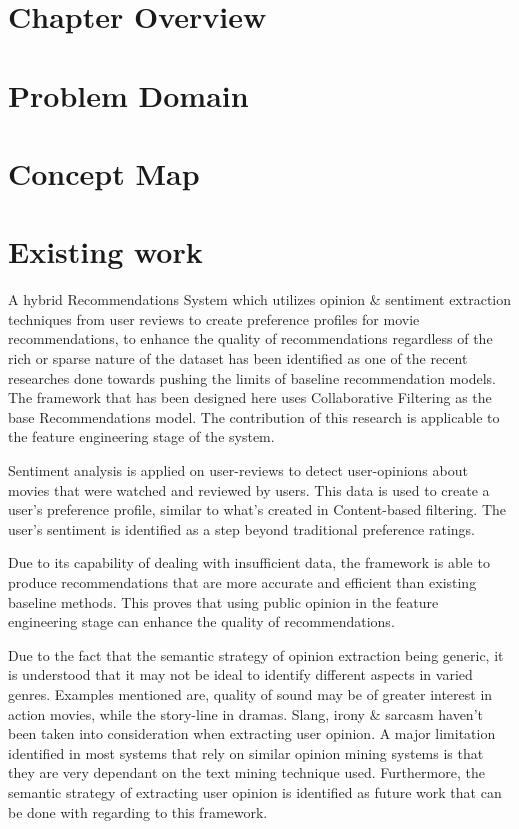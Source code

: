 
\section{Chapter Overview}

\section{Problem Domain}


\section{Concept Map}

\section{Existing work}
A hybrid Recommendations System \autocite{cheng_hybrid_2020} which utilizes opinion \& sentiment extraction techniques from user reviews to create preference profiles for movie recommendations, to enhance the quality of recommendations regardless of the rich or sparse nature of the dataset has been identified as one of the recent researches done towards pushing the limits of baseline recommendation models. The framework that has been designed here uses Collaborative Filtering as the base Recommendations model. The contribution of this research is applicable to the feature engineering stage of the system.

Sentiment analysis is applied on user-reviews to detect user-opinions about movies that were watched and reviewed by users. This data is used to create a user's preference profile, similar to what's created in Content-based filtering. The user's sentiment is identified as a step beyond traditional preference ratings.

Due to its capability of dealing with insufficient data, the framework is able to produce recommendations that are more accurate and efficient than existing baseline methods. This proves that using public opinion in the feature engineering stage can enhance the quality of recommendations.


Due to the fact that the semantic strategy of opinion extraction being generic, it is understood that it may not be ideal to identify different aspects in varied genres. Examples mentioned are, quality of sound may be of greater interest in action movies, while the story-line in dramas.
Slang, irony \& sarcasm haven't been taken into consideration when extracting user opinion.
A major limitation identified in most systems that rely on similar opinion mining systems is that they are very dependant on the text mining technique used. Furthermore, the semantic strategy of extracting user opinion is identified as future work that can be done with regarding to this framework.

